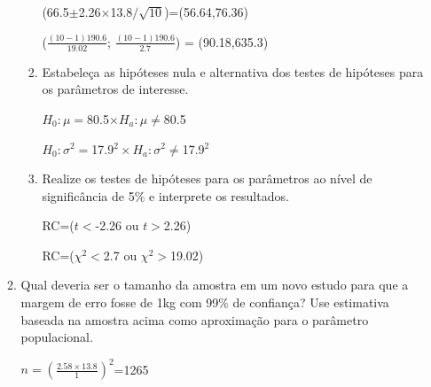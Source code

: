 \documentclass[
]{article}
\begin{document}
\begin{enumerate}
\begin{enumerate}
\begin{enumerate}
(66.5$\pm$2.26$\times$13.8$/\sqrt{10}$)=(56.64,76.36)

($\frac{(10-1)190.6}{19.02}$; $\frac{(10-1)190.6}{2.7}$) = (90.18,635.3)

\item Estabeleça as hipóteses nula e alternativa dos testes de hipóteses para os parâmetros de interesse.

$H_0: \mu=$80.5$\times H_a:\mu\neq$80.5

$H_0: \sigma^2=$17.9$^2 \times H_a:\sigma^2\neq$17.9$^2$

\item Realize os testes de hipóteses para os parâmetros ao nível de significância de 5\% e interprete os resultados. 



RC=($t <$-2.26 ou $t >$2.26)



RC=($\chi^2 <$2.7 ou $\chi^2 >$19.02)

\end{enumerate}
\item Qual deveria ser o tamanho da amostra em um novo estudo para que a margem de erro fosse de 1kg com 99\% de confiança? Use estimativa baseada na amostra acima como aproximação para o parâmetro populacional.


$n=(\frac{2.58\times 13.8}{1})^2$=1265

\end{enumerate}

\newpage




\end{enumerate}
\end{document}
